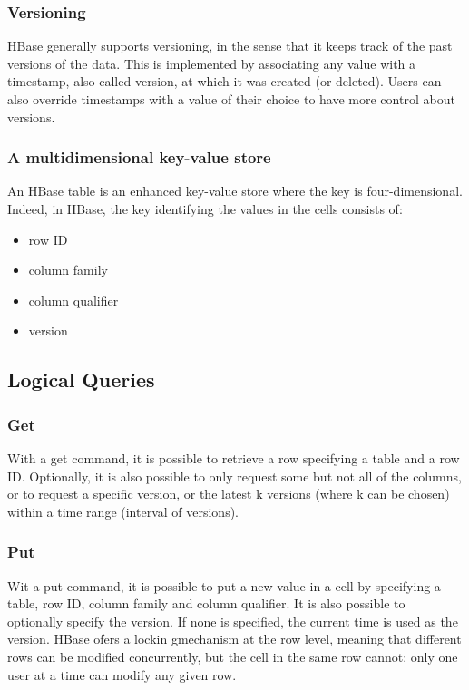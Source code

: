 \subsubsection{Versioning}
HBase generally supports versioning, in the sense that it keeps track of the past versions of the data. This is implemented by associating any value with a timestamp, also called version, at which it was created (or deleted). Users can also override timestamps with a value of their choice to have more control about versions.

\subsubsection{A multidimensional key-value store}
An HBase table is an enhanced key-value store where the key is four-dimensional. Indeed, in HBase, the key identifying the values in the cells consists of:
\begin{itemize}
    \item row ID
    \item column family
    \item column qualifier
    \item version
\end{itemize}

\subsection{Logical Queries}

\subsubsection{Get}
With a get command, it is possible to retrieve a row specifying a table and a row ID. Optionally, it is also possible to only request some but not all of the columns, or to request a specific version, or the latest k versions (where k can be chosen) within a time range (interval of versions).

\subsubsection{Put}
Wit a put command, it is possible to put a new value in a cell by specifying a table, row ID, column family and column qualifier. It is also possible to optionally specify the version. If none is specified, the current time is used as the version. HBase ofers a lockin gmechanism at the row level, meaning that different rows can be modified concurrently, but the cell in the same row cannot: only one user at a time can modify any given row.

